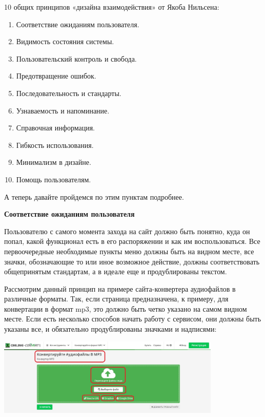 10 общих принципов «дизайна взаимодействия» от Якоба Нильсена:

\begin{enumerate}
    \item Соответствие ожиданиям пользователя.
    \item Видимость состояния системы.
    \item Пользовательский контроль и свобода.
    \item Предотвращение ошибок.
    \item Последовательность и стандарты.
    \item Узнаваемость и напоминание.
    \item Справочная информация.
    \item Гибкость использования.
    \item Минимализм в дизайне.
    \item Помощь пользователям.
\end{enumerate}

А теперь давайте пройдемся по этим пунктам подробнее.

\textbf{Соответствие ожиданиям пользователя}

Пользователю с самого момента захода на сайт должно быть понятно, куда он попал, какой функционал есть в его распоряжении и как им воспользоваться. Все первоочередные необходимые пункты меню должны быть на видном месте, все значки, обозначающие то или иное возможное действие, должны соответствовать общепринятым стандартам, а в идеале еще и продублированы текстом.

Рассмотрим данный принцип на примере сайта-конвертера аудиофайлов в различные форматы. Так, если страница предназначена, к примеру, для конвертации в формат mp3, это должно быть четко указано на самом видном месте. Если есть несколько способов начать работу с сервисом, они должны быть указаны все, и обязательно продублированы значками и надписями:

\begin{center}
    \includegraphics[width=0.8\textwidth]{img/cxp1.jpg}
\end{center}

